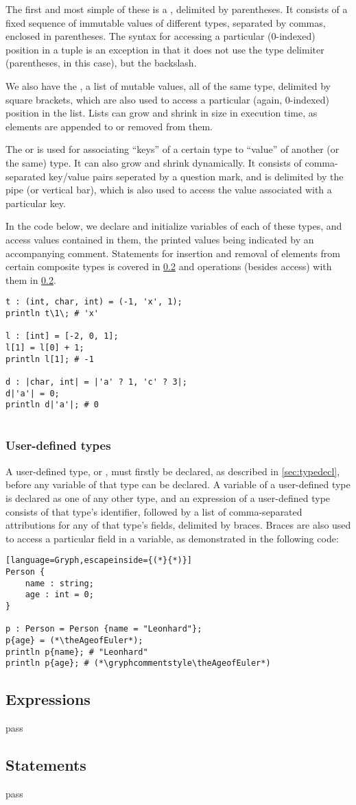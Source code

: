 The first and most simple of these is a , delimited by parentheses. It consists of a fixed sequence of immutable values of different types, separated by commas, enclosed in parentheses. The syntax for accessing a particular (0-indexed) position in a tuple is an exception in that it does not use the type delimiter (parentheses, in this case), but the backslash.

We also have the , a list of mutable values, all of the same type, delimited by square brackets, which are also used to access a particular (again, 0-indexed) position in the list. Lists can grow and shrink in size in execution time, as elements are appended to or removed from them.

The  or  is used for associating ``keys'' of a certain type to ``value'' of another (or the same) type. It can also grow and shrink dynamically. It consists of comma-separated key/value pairs seperated by a question mark, and is delimited by the pipe (or vertical bar), which is also used to access the value associated with a particular key.


In the code below, we declare and initialize variables of each of these types, and access values contained in them, the printed values being indicated by an accompanying comment. Statements for insertion and removal of elements from certain composite types is covered in \ref{} and operations (besides access) with them in \ref{}.
\begin{lstlisting}[language=Gryph]
t : (int, char, int) = (-1, 'x', 1);
println t\1\; # 'x'

l : [int] = [-2, 0, 1];
l[1] = l[0] + 1;
println l[1]; # -1

d : |char, int| = |'a' ? 1, 'c' ? 3|;
d|'a'| = 0;
println d|'a'|; # 0


\end{lstlisting}
\subsubsection{User-defined types}
\label{sec:usertypes}
A user-defined type, or , must firstly be declared, as described in \ref{sec:typedecl}, before any variable of that type can be declared. A variable of a user-defined type is declared as one of any other type, and an expression of a user-defined type consists of that type's identifier, followed by a list of comma-separated attributions for any of that type's fields, delimited by braces. Braces are also used to access a particular field in a  variable, as demonstrated in the following code:
\setcounter{AgeofEuler}{\year-1707}
\begin{lstlisting}[language=Gryph,escapeinside={(*}{*)}]
Person {
	name : string;
	age : int = 0;
}

p : Person = Person {name = "Leonhard"};
p{age} = (*\theAgeofEuler*);
println p{name}; # "Leonhard"
println p{age}; # (*\gryphcommentstyle\theAgeofEuler*)
\end{lstlisting}

\subsection{Expressions}
pass

\subsection{Statements}
pass